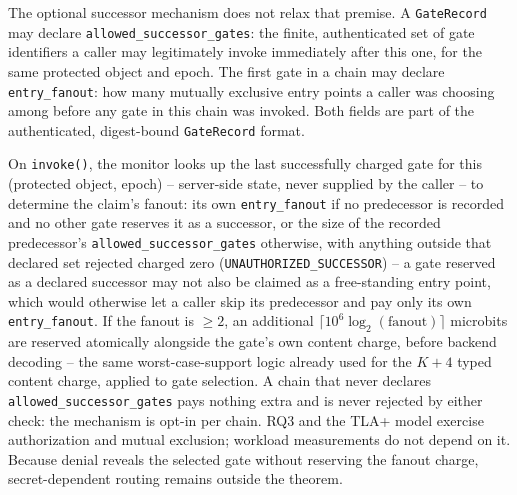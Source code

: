\documentclass[conference,compsoc]{IEEEtran}
\begin{document}
The optional successor mechanism does not relax that premise. A
\texttt{GateRecord} may
declare \texttt{allowed\_successor\_gates}: the finite, authenticated set of
gate identifiers a caller may legitimately invoke immediately after this
one, for the same protected object and epoch. The first gate in a chain may
declare \texttt{entry\_fanout}: how many mutually exclusive entry points a
caller was choosing among before any gate in this chain was invoked. Both
fields are part of the authenticated, digest-bound \texttt{GateRecord}
format.

On \texttt{invoke()}, the monitor looks up the last successfully charged
gate for this (protected object, epoch) -- server-side state, never
supplied by the caller -- to determine the claim's fanout: its own
\texttt{entry\_fanout} if no predecessor is recorded and no other gate
reserves it as a successor, or the size of the recorded predecessor's
\texttt{allowed\_successor\_gates} otherwise, with anything outside that
declared set rejected charged zero (\texttt{UNAUTHORIZED\_SUCCESSOR}) --
a gate reserved as a declared successor may not also be claimed as a
free-standing entry point, which would otherwise let a caller skip its
predecessor and pay only its own \texttt{entry\_fanout}. If the fanout is
$\geq 2$, an additional $\lceil 10^6\log_2(\text{fanout})\rceil$
microbits are reserved atomically alongside the gate's own content
charge, before backend decoding -- the same worst-case-support logic
already used for the $K+4$ typed content charge, applied to gate
selection. A chain that never declares \texttt{allowed\_successor\_gates}
pays nothing extra and is never rejected by either check: the mechanism
is opt-in per chain. RQ3 and the TLA+ model exercise authorization and mutual
exclusion; workload measurements do not depend on it. Because denial reveals
the selected gate without reserving the fanout charge, secret-dependent
routing remains outside the theorem.
\end{document}
